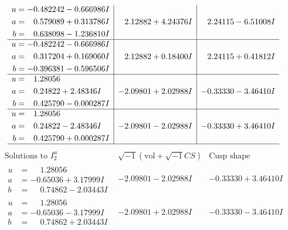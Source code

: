 \documentclass[1p]{elsarticle_modified}
\theoremstyle{definition}
\newcommand{\I}{\sqrt{-1}}
\begin{document}
$$\begin{array}{c|c|c}
\begin{aligned}
u &= -0.482242 - 0.666986 I \\
a &= \phantom{-}0.579089 + 0.313786 I \\
b &= \phantom{-}0.638098 - 1.236810 I\end{aligned}
 & \phantom{-}2.12882 + 4.24376 I & \phantom{-}2.24115 - 6.51008 I \\ \hline\begin{aligned}
u &= -0.482242 - 0.666986 I \\
a &= \phantom{-}0.317204 + 0.169060 I \\
b &= -0.396381 - 0.596506 I\end{aligned}
 & \phantom{-}2.12882 + 0.18400 I & \phantom{-}2.24115 + 0.41812 I \\ \hline\begin{aligned}
u &= \phantom{-}1.28056\phantom{ +0.000000I} \\
a &= \phantom{-}0.24822 + 2.48346 I \\
b &= \phantom{-}0.425790 - 0.000287 I\end{aligned}
 & -2.09801 + 2.02988 I & -0.33330 - 3.46410 I \\ \hline\begin{aligned}
u &= \phantom{-}1.28056\phantom{ +0.000000I} \\
a &= \phantom{-}0.24822 - 2.48346 I \\
b &= \phantom{-}0.425790 + 0.000287 I\end{aligned}
 & -2.09801 - 2.02988 I & -0.33330 + 3.46410 I\\
 \hline 
 \end{array}$$\newpage$$\begin{array}{c|c|c}  
\text{Solutions to }I^u_{2}& \I (\text{vol} + \sqrt{-1}CS) & \text{Cusp shape}\\
 \hline 
\begin{aligned}
u &= \phantom{-}1.28056\phantom{ +0.000000I} \\
a &= -0.65036 + 3.17999 I \\
b &= \phantom{-}0.74862 - 2.03443 I\end{aligned}
 & -2.09801 - 2.02988 I & -0.33330 + 3.46410 I \\ \hline\begin{aligned}
u &= \phantom{-}1.28056\phantom{ +0.000000I} \\
a &= -0.65036 - 3.17999 I \\
b &= \phantom{-}0.74862 + 2.03443 I\end{aligned}
 & -2.09801 + 2.02988 I & -0.33330 - 3.46410 I \\ \hline\begin{aligned}

\end{aligned}
\end{array}$$
\end{document}
